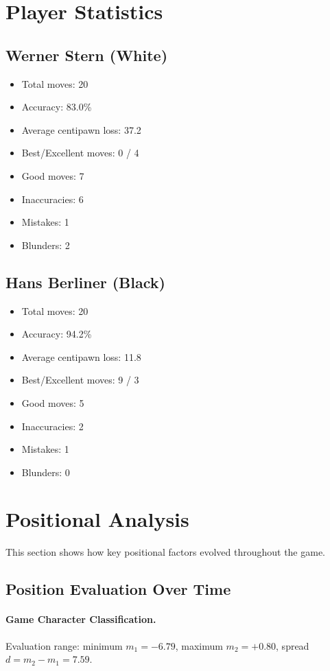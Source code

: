 \documentclass[11pt]{book}
\begin{document}
\section{Player Statistics}

\subsection{Werner Stern (White)}
\begin{itemize}
\item Total moves: 20
\item Accuracy: 83.0\%
\item Average centipawn loss: 37.2
\item Best/Excellent moves: 0 / 4
\item Good moves: 7
\item Inaccuracies: 6
\item Mistakes: 1
\item Blunders: 2
\end{itemize}

\subsection{Hans Berliner (Black)}
\begin{itemize}
\item Total moves: 20
\item Accuracy: 94.2\%
\item Average centipawn loss: 11.8
\item Best/Excellent moves: 9 / 3
\item Good moves: 5
\item Inaccuracies: 2
\item Mistakes: 1
\item Blunders: 0
\end{itemize}

\section{Positional Analysis}

This section shows how key positional factors evolved throughout the game.

\subsection{Position Evaluation Over Time}

\paragraph{Game Character Classification.}
Evaluation range: minimum $m_1 = -6.79$, maximum $m_2 = +0.80$, spread $d = m_2 - m_1 = 7.59$.
\end{document}
